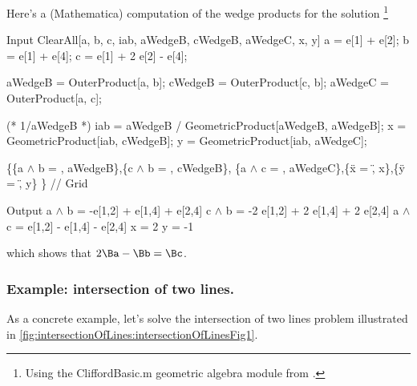 Here's a (Mathematica) computation of the wedge products for the solution
\footnote{%
Using the CliffordBasic.m geometric algebra module from \citep{jlaragonveraGeometricAlgebra}.%
}

\begin{mmaCell}[moredefined={a, b, c, iab, aWedgeB, cWedgeB, aWedgeC, x, y, e, OuterProduct, GeometricProduct}]{Input}
  ClearAll[a, b, c, iab, aWedgeB, cWedgeB, aWedgeC, x, y]
  a = e[1] + e[2];
  b = e[1] + e[4];
  c = e[1] + 2 e[2] - e[4];

  aWedgeB = OuterProduct[a, b];
  cWedgeB = OuterProduct[c, b];
  aWedgeC = OuterProduct[a, c];

  (* 1/aWedgeB *)
  iab = aWedgeB / GeometricProduct[aWedgeB, aWedgeB];
  x = GeometricProduct[iab, cWedgeB];
  y = GeometricProduct[iab, aWedgeC];

  \{\{a \(\pmb{\wedge}\) b = , aWedgeB\},\{c \(\pmb{\wedge}\) b = , cWedgeB\},
  \{a \(\pmb{\wedge}\) c = , aWedgeC\},\{\"x = \", x\},\{\"y = \", y\}
  \} // Grid
\end{mmaCell}
\begin{mmaCell}{Output}
  a \(\wedge\) b = 	-e[1,2] + e[1,4] + e[2,4]
  c \(\wedge\) b = 	-2 e[1,2] + 2 e[1,4] + 2 e[2,4]
  a \(\wedge\) c = 	e[1,2] - e[1,4] - e[2,4]
  x = 	2
  y = 	-1
\end{mmaCell}

which shows that \( 2 \Ba - \Bb = \Bc \).
\subsubsection{Example: intersection of two lines.}

As a concrete example, let's solve the intersection of two lines problem illustrated in \cref{fig:intersectionOfLines:intersectionOfLinesFig1}.


